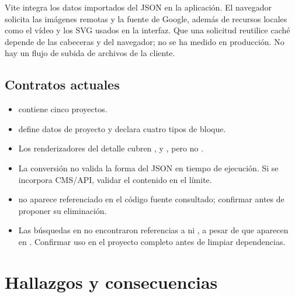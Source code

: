\documentclass[11pt,a4paper]{report}
\begin{document}
Vite integra los datos importados del JSON en la aplicación. El navegador solicita las imágenes remotas y la fuente de Google, además de recursos locales como el vídeo y los SVG usados en la interfaz. Que una solicitud reutilice caché depende de las cabeceras y del navegador; no se ha medido en producción. No hay un flujo de subida de archivos de la cliente.

\section{Contratos actuales}

\begin{itemize}
  \item {} contiene cinco proyectos.
  \item {} define datos de proyecto y  declara cuatro tipos de bloque.
  \item Los renderizadores del detalle cubren ,  y , pero no .
  \item La conversión  no valida la forma del JSON en tiempo de ejecución. Si se incorpora CMS/API, validar el contenido en el límite.
  \item {} no aparece referenciado en el código fuente consultado; confirmar antes de proponer su eliminación.
  \item Las búsquedas en  no encontraron referencias a  ni , a pesar de que aparecen en . Confirmar uso en el proyecto completo antes de limpiar dependencias.
\end{itemize}

\chapter{Hallazgos y consecuencias}
\end{document}
